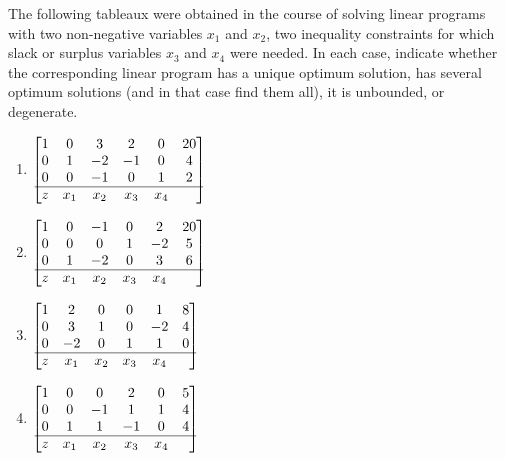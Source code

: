 \begin{problem}[Basic]
The following tableaux were obtained in the course of solving linear programs with two non-negative variables $x_1$ and $x_2$, two inequality constraints for which slack or surplus variables $x_3$ and $x_4$ were needed.  In each case, indicate whether the corresponding linear program has a unique optimum solution, has several optimum solutions (and in that case find them all), it is unbounded, or degenerate.
\begin{enumerate}
\item $\displaystyle{%
\begin{bmatrix}
1 &   0 &   3 &   2 &   0 & 20 \\
0 &   1 &  -2 &  -1 &   0 &  4 \\
0 &   0 &  -1 &   0 &   1 &  2 \\ \hline
z & x_1 & x_2 & x_3 & x_4
\end{bmatrix}
}$\smallskip
\item $\displaystyle{%
\begin{bmatrix}
1 &   0 &  -1 &   0 &   2 & 20 \\
0 &   0 &   0 &   1 &  -2 &  5 \\
0 &   1 &  -2 &   0 &   3 &  6 \\ \hline
z & x_1 & x_2 & x_3 & x_4
\end{bmatrix}
}$\smallskip
\item $\displaystyle{%
\begin{bmatrix}
1 &   2 &   0 &   0 &   1 &  8 \\
0 &   3 &   1 &   0 &  -2 &  4 \\
0 &  -2 &   0 &   1 &   1 &  0 \\ \hline
z & x_1 & x_2 & x_3 & x_4
\end{bmatrix}
}$\smallskip
\item $\displaystyle{%
\begin{bmatrix}
1 &   0 &   0 &   2 &   0 &  5 \\
0 &   0 &  -1 &   1 &   1 &  4 \\
0 &   1 &   1 &  -1 &   0 &  4 \\ \hline
z & x_1 & x_2 & x_3 & x_4
\end{bmatrix}
}$
\end{enumerate}
\end{problem}

